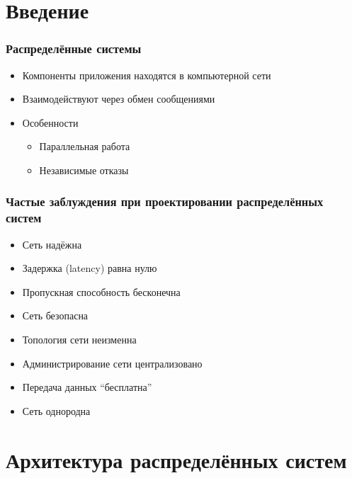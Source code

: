 \documentclass{../../slides-style}
\begin{document}
    
    \begin{frame}[plain]
        \titlepage
    \end{frame}

    \section{Введение}

    \begin{frame}
        \frametitle{Распределённые системы}
        \begin{itemize}
            \item Компоненты приложения находятся в компьютерной сети
            \item Взаимодействуют через обмен сообщениями
            \item Особенности
            \begin{itemize}
                \item Параллельная работа
                \item Независимые отказы
            \end{itemize}
        \end{itemize}
    \end{frame}

    \begin{frame}
        \frametitle{Частые заблуждения при проектировании распределённых систем}
        \begin{itemize}
            \item Сеть надёжна
            \item Задержка (latency) равна нулю
            \item Пропускная способность бесконечна
            \item Сеть безопасна
            \item Топология сети неизменна
            \item Администрирование сети централизовано
            \item Передача данных ``бесплатна''
            \item Сеть однородна
        \end{itemize}
    \end{frame}

    \section{Архитектура распределённых систем}
\end{document}
